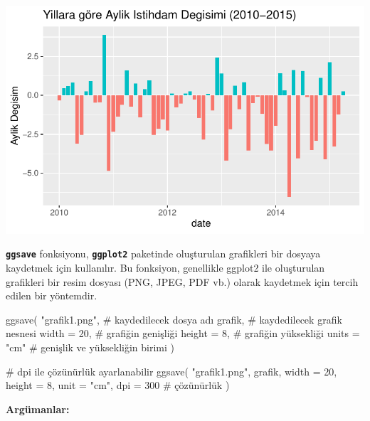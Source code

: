 \documentclass[
  letterpaper,
  DIV=11,
  numbers=noendperiod]{scrreprt}
\newenvironment{Shaded}{\begin{snugshade}}{\end{snugshade}}
\newcommand{\AttributeTok}[1]{\textcolor[rgb]{0.40,0.45,0.13}{#1}}
\newcommand{\CommentTok}[1]{\textcolor[rgb]{0.37,0.37,0.37}{#1}}
\newcommand{\DecValTok}[1]{\textcolor[rgb]{0.68,0.00,0.00}{#1}}
\newcommand{\FunctionTok}[1]{\textcolor[rgb]{0.28,0.35,0.67}{#1}}
\newcommand{\NormalTok}[1]{\textcolor[rgb]{0.00,0.23,0.31}{#1}}
\newcommand{\StringTok}[1]{\textcolor[rgb]{0.13,0.47,0.30}{#1}}
\begin{document}
\includegraphics{ggplot2_files/figure-pdf/unnamed-chunk-27-1.pdf}

\textbf{\texttt{ggsave}} fonksiyonu, \textbf{\texttt{ggplot2}} paketinde
oluşturulan grafikleri bir dosyaya kaydetmek için kullanılır. Bu
fonksiyon, genellikle ggplot2 ile oluşturulan grafikleri bir resim
dosyası (PNG, JPEG, PDF vb.) olarak kaydetmek için tercih edilen bir
yöntemdir.

\begin{Shaded}
\begin{Highlighting}[]
\FunctionTok{ggsave}\NormalTok{(}
  \StringTok{"grafik1.png"}\NormalTok{, }\CommentTok{\# kaydedilecek dosya adı}
\NormalTok{  grafik, }\CommentTok{\# kaydedilecek grafik nesnesi}
  \AttributeTok{width =} \DecValTok{20}\NormalTok{, }\CommentTok{\# grafiğin genişliği}
  \AttributeTok{height =} \DecValTok{8}\NormalTok{, }\CommentTok{\# grafiğin yüksekliği}
  \AttributeTok{units =} \StringTok{"cm"} \CommentTok{\# genişlik ve yüksekliğin birimi}
\NormalTok{)}

\CommentTok{\# dpi ile çözünürlük ayarlanabilir}
\FunctionTok{ggsave}\NormalTok{(}
  \StringTok{"grafik1.png"}\NormalTok{,}
\NormalTok{  grafik,}
  \AttributeTok{width =} \DecValTok{20}\NormalTok{,}
  \AttributeTok{height =} \DecValTok{8}\NormalTok{,}
  \AttributeTok{unit =} \StringTok{"cm"}\NormalTok{,}
  \AttributeTok{dpi =} \DecValTok{300} \CommentTok{\# çözünürlük}
\NormalTok{)}
\end{Highlighting}
\end{Shaded}

\textbf{Argümanlar:}
\end{document}
